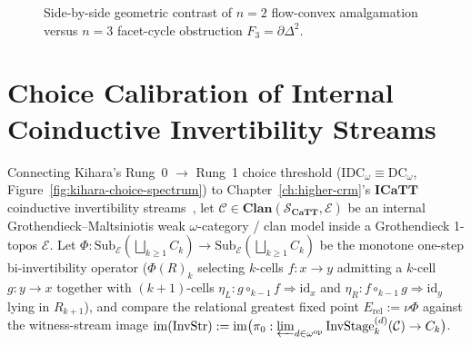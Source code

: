 \documentclass[10pt,twoside,openright]{book}
\theoremstyle{crmplain}
\theoremstyle{crmdef}
\theoremstyle{crmremark}
\begin{document}
\begin{figure}[htbp]
\caption{Side-by-side geometric contrast of $n=2$ flow-convex amalgamation versus $n=3$ facet-cycle obstruction $F_3 = \partial\Delta^2$.}\label{fig:cubical-amalgamation-dichotomy}
\end{figure}

\section{Choice Calibration of Internal Coinductive Invertibility Streams}\label{subsec:coinductive-streams-choice}

Connecting Kihara's Rung~0 $\to$ Rung~1 choice threshold ($\mathrm{IDC}_\omega \equiv \mathrm{DC}_\omega$, Figure~\ref{fig:kihara-choice-spectrum}) to Chapter~\ref{ch:higher-crm}'s $\mathbf{ICaTT}$ coinductive invertibility streams~\cite{BCM26,FinsterMimram17,ORW26}, let $\mathcal{C} \in \mathbf{Clan}(\mathcal{S}_{\mathbf{CaTT}}, \mathcal{E})$ be an internal Grothendieck--Maltsiniotis weak $\omega$-category / clan model inside a Grothendieck 1-topos $\mathcal{E}$. Let $\Phi : \mathrm{Sub}_{\mathcal{E}}(\bigsqcup_{k \ge 1} C_k) \to \mathrm{Sub}_{\mathcal{E}}(\bigsqcup_{k \ge 1} C_k)$ be the monotone one-step bi-invertibility operator ($\Phi(R)_k$ selecting $k$-cells $f : x \to y$ admitting a $k$-cell $g : y \to x$ together with $(k+1)$-cells $\eta_L : g \circ_{k-1} f \Rightarrow \mathrm{id}_x$ and $\eta_R : f \circ_{k-1} g \Rightarrow \mathrm{id}_y$ lying in $R_{k+1}$), and compare the relational greatest fixed point $E_{\mathrm{rel}} := \nu\Phi$ against the witness-stream image $\mathrm{im}(\mathrm{InvStr}) := \mathrm{im}\bigl(\pi_0 : \varprojlim_{d \in \omega^{\mathrm{op}}} \mathrm{InvStage}^{(d)}_k(\mathcal{C}) \to C_k\bigr)$.
\end{document}

